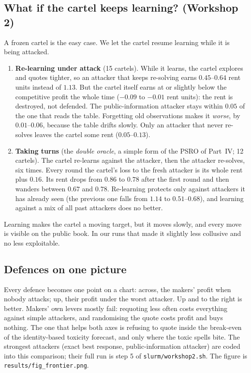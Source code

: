 \documentclass[11pt]{article}
\begin{document}
\subsection{What if the cartel keeps learning? (Workshop 2)}
A frozen cartel is the easy case. We let the cartel resume learning while it is being attacked.
\begin{enumerate}
\item \textbf{Re-learning under attack} (15 cartels). While it learns, the cartel explores and quotes
tighter, so an attacker that keeps re-solving earns $0.45$--$0.64$ rent units instead of $1.13$. But the
cartel itself earns at or slightly below the competitive profit the whole time ($-0.09$ to $-0.01$ rent
units): the rent is destroyed, not defended. The public-information attacker stays within $0.05$ of the
one that reads the table. Forgetting old observations makes it \emph{worse}, by $0.01$--$0.06$, because
the table drifts slowly. Only an attacker that never re-solves leaves the cartel some rent
($0.05$--$0.13$).
\item \textbf{Taking turns} (the \emph{double oracle}, a simple form of the PSRO of Part~IV; 12
cartels). The cartel re-learns against the attacker, then the attacker re-solves, six times. Every
round the cartel's loss to the fresh attacker is its whole rent plus $0.16$. Its rent drops from $0.86$
to $0.78$ after the first round and then wanders between $0.67$ and $0.78$. Re-learning protects only
against attackers it has already seen (the previous one falls from $1.14$ to $0.51$--$0.68$), and
learning against a mix of all past attackers does no better.
\end{enumerate}
\begin{intuition}
Learning makes the cartel a moving target, but it moves slowly, and every move is visible on the
public book. In our runs that made it slightly less collusive and no less exploitable.
\end{intuition}

\subsection{Defences on one picture}
Every defence becomes one point on a chart: across, the makers' profit when nobody attacks; up, their
profit under the worst attacker. Up and to the right is better. Makers' own levers mostly fail:
requoting less often costs everything against simple attackers, and randomising the quote costs profit
and buys nothing. The one that helps both axes is refusing to quote inside the break-even of the
identity-based toxicity forecast, and only where the toxic spells bite. The strongest attackers
(exact best response, public-information attacker) are coded into this comparison; their full run is
step 5 of \texttt{slurm/workshop2.sh}. The figure is \texttt{results/fig\_frontier.png}.
\end{document}
